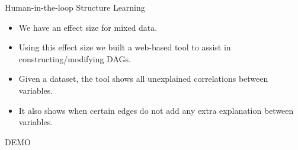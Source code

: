 \documentclass{beamer}
\begin{document}
\begin{frame}{Human-in-the-loop Structure Learning}
	\begin{itemize}
		\item We have an effect size for mixed data.
		\item Using this effect size we built a web-based tool to assist in constructing/modifying DAGs.
		\item Given a dataset, the tool shows all unexplained correlations between variables.
		\item It also shows when certain edges do not add any extra explanation between variables.
	\end{itemize}
\end{frame}

\begin{frame}
	\center \huge DEMO
\end{frame}
\end{document}
